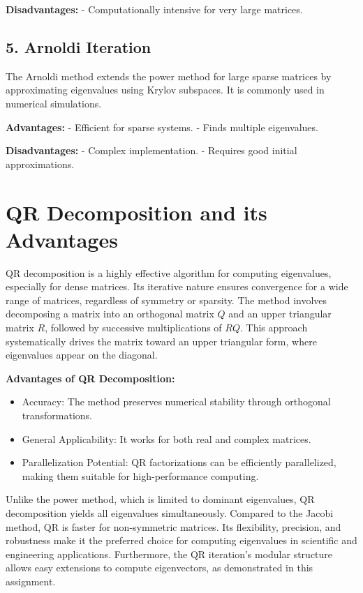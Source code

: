 \documentclass[12pt,a4paper]{article}
\begin{document}
\textbf{Disadvantages:}  
- Computationally intensive for very large matrices.

\subsection*{5. Arnoldi Iteration}
The Arnoldi method extends the power method for large sparse matrices by approximating eigenvalues using Krylov subspaces. It is commonly used in numerical simulations.

\textbf{Advantages:}  
- Efficient for sparse systems.  
- Finds multiple eigenvalues.  

\textbf{Disadvantages:}  
- Complex implementation.  
- Requires good initial approximations.

\newpage
\section*{QR Decomposition and its Advantages}
QR decomposition is a highly effective algorithm for computing eigenvalues, especially for dense matrices. Its iterative nature ensures convergence for a wide range of matrices, regardless of symmetry or sparsity. The method involves decomposing a matrix into an orthogonal matrix \( Q \) and an upper triangular matrix \( R \), followed by successive multiplications of \( RQ \). This approach systematically drives the matrix toward an upper triangular form, where eigenvalues appear on the diagonal.

\textbf{Advantages of QR Decomposition:}
\begin{itemize}
    \item Accuracy: The method preserves numerical stability through orthogonal transformations.
    \item General Applicability: It works for both real and complex matrices.
    \item Parallelization Potential: QR factorizations can be efficiently parallelized, making them suitable for high-performance computing.
\end{itemize}

Unlike the power method, which is limited to dominant eigenvalues, QR decomposition yields all eigenvalues simultaneously. Compared to the Jacobi method, QR is faster for non-symmetric matrices. Its flexibility, precision, and robustness make it the preferred choice for computing eigenvalues in scientific and engineering applications. Furthermore, the QR iteration's modular structure allows easy extensions to compute eigenvectors, as demonstrated in this assignment.
\end{document}
